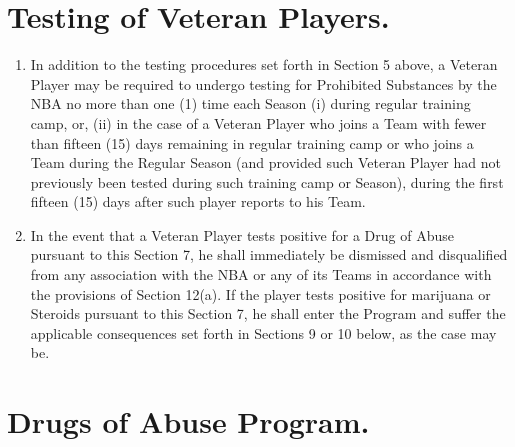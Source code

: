 \documentclass[
]{book}
\providecommand{\tightlist}{%
  \setlength{\itemsep}{0pt}\setlength{\parskip}{0pt}}
\begin{document}
\hypertarget{testing-of-veteran-players.}{%
\section{Testing of Veteran Players.}\label{testing-of-veteran-players.}}

\begin{enumerate}
\def\labelenumi{(\alph{enumi})}
\tightlist
\item
  In addition to the testing procedures set forth in Section 5 above, a Veteran Player may be required to undergo testing for Prohibited Substances by the NBA no more than one (1) time each Season (i) during regular training camp, or, (ii) in the case of a Veteran Player who joins a Team with fewer than fifteen (15) days remaining in regular training camp or who joins a Team during the Regular Season (and provided such Veteran Player had not previously been tested during such training camp or Season), during the first fifteen (15) days after such player reports to his Team.
\item
  In the event that a Veteran Player tests positive for a Drug of Abuse pursuant to this Section 7, he shall immediately be dismissed and disqualified from any association with the NBA or any of its Teams in accordance with the provisions of Section 12(a). If the player tests positive for marijuana or Steroids pursuant to this Section 7, he shall enter the Program and suffer the applicable consequences set forth in Sections 9 or 10 below, as the case may be.
\end{enumerate}

\hypertarget{drugs-of-abuse-program.}{%
\section{Drugs of Abuse Program.}\label{drugs-of-abuse-program.}}
\end{document}
